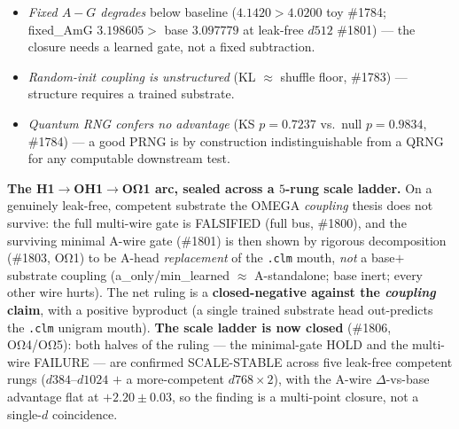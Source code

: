 \documentclass[11pt]{article}
\begin{document}
\begin{itemize}
$+1.953167\gg$ shuf $-2.429212$, structured$=$True, confirming the leak-honest \#1791 finding
at the best-trained scale.) \emph{This multi-wire failure is scale-invariant} (\#1806, OΩ4/OΩ5):
the full\_AG gate collapses onto A ($g_A\,3.2$--$3.6$, $g_G\approx-1.0$) and stays $>$ base
(full\_AG CE $3.28$--$3.84$) at \emph{every} rung of the $d384$--$d1024$ ladder.
\item \emph{Fixed $A{-}G$ degrades} below baseline ($4.1420>4.0200$ toy \#1784;
fixed\_AmG $3.198605>$ base $3.097779$ at leak-free $d512$ \#1801) --- the closure
needs a learned gate, not a fixed subtraction.
\item \emph{Random-init coupling is unstructured} (KL $\approx$ shuffle floor, \#1783) ---
structure requires a trained substrate.
\item \emph{Quantum RNG confers no advantage} (KS $p=0.7237$ vs.\ null $p=0.9834$, \#1784) ---
a good PRNG is by construction indistinguishable from a QRNG for any computable downstream test.
\end{itemize}

\textbf{The H1$\rightarrow$OH1$\rightarrow$OΩ1 arc, sealed across a $5$-rung scale ladder.} On a
genuinely leak-free, competent substrate the OMEGA \emph{coupling} thesis does not survive:
the full multi-wire gate is FALSIFIED (full bus, \#1800), and the surviving minimal A-wire gate
(\#1801) is then shown by rigorous decomposition (\#1803, OΩ1) to be A-head \emph{replacement}
of the \texttt{.clm} mouth, \emph{not} a base$+$substrate coupling (a\_only/min\_learned
$\approx$ A-standalone; base inert; every other wire hurts). The net ruling is a
\textbf{closed-negative against the \emph{coupling} claim}, with a positive byproduct (a single
trained substrate head out-predicts the \texttt{.clm} unigram mouth). \textbf{The scale ladder is
now closed} (\#1806, OΩ4/OΩ5): both halves of the ruling --- the minimal-gate HOLD and the
multi-wire FAILURE --- are confirmed SCALE-STABLE across five leak-free competent rungs
($d384$--$d1024$ $+$ a more-competent $d768{\times}2$), with the A-wire $\Delta$-vs-base advantage
flat at $+2.20\pm0.03$, so the finding is a multi-point closure, not a single-$d$ coincidence.
\end{document}
